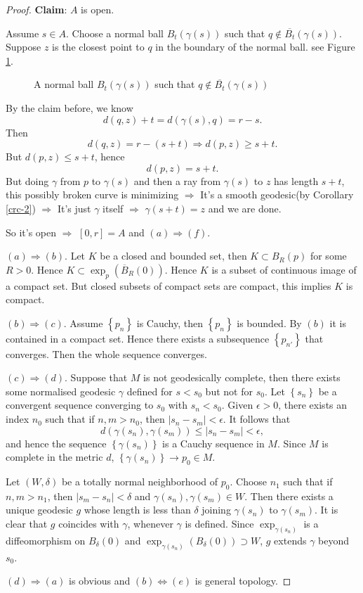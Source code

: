 \begin{proof}
 \textbf{Claim}: $A$ is open.

 Assume $s\in A$. Choose a normal ball $B_t(\gamma(s))$ such that $q\notin \overline{B_t}\left( \gamma(s) \right) $. Suppose $z$ is the closest point to $q$ in the boundary of the normal ball. see Figure \ref{fig:openness-of-a}.

\begin{figure}[ht]
    \centering
    \caption{A normal ball $B_t(\gamma(s))$ such that $q\notin \overline{B_t}\left( \gamma(s) \right)$}
    \label{fig:openness-of-a}
\end{figure}
By the claim before, we know 
\[
  d(q,z)+t=d(\gamma(s),q)=r-s.
\] 
Then 
\[
  d(q,z)=r-(s+t)\Rightarrow d(p,z)\ge s+t.
\]
But $d(p,z)\le s+t$, hence
 \[
   d(p,z)=s+t.
\] 
But doing $\gamma$ from $p$ to $\gamma(s)$ and then a ray from $\gamma(s)$ to $z$ has length $s+t$, this possibly broken curve is minimizing $\Rightarrow$ It's a smooth geodesic(by Corollary \ref{crc-2}) $\Rightarrow$ It's just $\gamma$ itself $\Rightarrow$ $\gamma(s+t)=z$ and we are done.

So it's open $\Rightarrow$ $[0,r]=A$ and $(a)\Rightarrow (f)$.


$(a)\Rightarrow(b)$. Let $K$ be a closed and bounded set, then $K\subset B_R(p)$ for some $R>0$. Hence $K\subset \exp_p(\overline{B}_R(0))$. Hence $K$ is a subset of continuous image of a compact set. But closed subsets of compact sets are compact, this implies $K$ is compact.

$(b)\Rightarrow(c)$. Assume $\left\{p_n\right\} $ is Cauchy, then $\left\{p_n\right\} $ is bounded. By $(b)$ it is contained in a compact set. Hence there exists a subsequence $\left\{p_{n'}\right\} $ that converges. Then the whole sequence converges.

$(c)\Rightarrow(d)$. Suppose that $M$ is not geodesically complete, then there exists some normalised geodesic $\gamma$ defined for $s<s_0$ but not for $s_0$. Let $\left\{s_n\right\} $ be a convergent sequence converging to $s_0$ with $s_n<s_0$. Given $\epsilon >0$, there exists an index $n_0$ such that if $n,m>n_0$, then $|s_n-s_m|<\epsilon $. It follows that 
\[
  d(\gamma(s_n),\gamma(s_m))\le |s_n-s_m|<\epsilon,
\] 
and hence the sequence $\left\{\gamma(s_n)\right\} $ is a Cauchy sequence in $M$. Since $M$ is complete in the metric $d$, $\left\{\gamma(s_n)\right\} \to p_0\in M$.

Let $(W,\delta)$ be a totally normal neighborhood of $p_0$. Choose $n_1$ such that if $n,m>n_1$, then $|s_m-s_n|<\delta$ and $\gamma(s_n),\gamma(s_m)\in W$. Then there exists a unique geodesic $g$ whose length is less than $\delta$ joining $\gamma(s_n)$ to $\gamma(s_m)$. It is clear that $g$ coincides with $\gamma$, whenever $\gamma$ is defined. Since $\exp_{\gamma(s_n)}$ is a diffeomorphism on $B_\delta(0)$ and $\exp_{\gamma(s_n)}(B_\delta(0))\supset W$, $g$ extends $\gamma$ beyond $s_0$.

$(d)\Rightarrow (a)$ is obvious and $(b)\Leftrightarrow (e)$ is general topology.
\end{proof}

